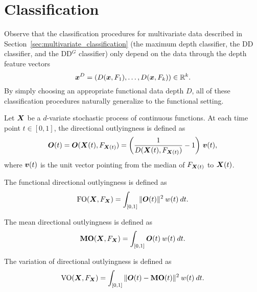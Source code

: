 \section{Classification}

Observe that the classification procedures for multivariate data described in
Section~\ref{sec:multivariate_classification} (the maximum depth classifier,
the DD classifier, and the DD$^G$ classifier) only depend on the data through
the depth feature vectors
\begin{equation}
    \bm{x}^D = (D(\bm{x}, F_1), \dots, D(\bm{x}, F_k)) \in \mathbb{R}^k.
\end{equation}
By simply choosing an appropriate functional data depth $D$, all of these
classification procedures naturally generalize to the functional setting.




\begin{definition}
    Let $\bm{X}$ be a $d$-variate stochastic process of continuous functions.
    At each time point $t \in [0, 1]$, the directional outlyingness is defined
    as
    \begin{equation}
        \bm{O}(t) = \bm{O}(\bm{X}(t), F_{\bm{X}(t)}) = \left(\frac{1}{D(\bm{X}(t), F_{\bm{X}(t)})} - 1\right)\, \bm{v}(t),
    \end{equation}
    where $\bm{v}(t)$ is the unit vector pointing from the median of $F_{\bm{X}(t)}$
    to $\bm{X}(t)$.
\end{definition}

\begin{definition}
    The functional directional outlyingness is defined as
    \begin{equation}
        \operatorname{FO}(\bm{X}, F_{\bm{X}}) = \int_{[0, 1]} \Vert \bm{O}(t) \Vert^2 \:w(t)\:dt.
    \end{equation}
\end{definition}

\begin{definition}
    The mean directional outlyingness is defined as
    \begin{equation}
        \operatorname{\textbf{MO}}(\bm{X}, F_{\bm{X}}) = \int_{[0, 1]} \bm{O}(t) \:w(t)\:dt.
    \end{equation}
\end{definition}

\begin{definition}
    The variation of directional outlyingness is defined as
    \begin{equation}
        \operatorname{VO}(\bm{X}, F_{\bm{X}}) = \int_{[0, 1]} \Vert \bm{O}(t) - \operatorname{\textbf{MO}}(t) \Vert^2 \:w(t)\:dt.
    \end{equation}
\end{definition}

